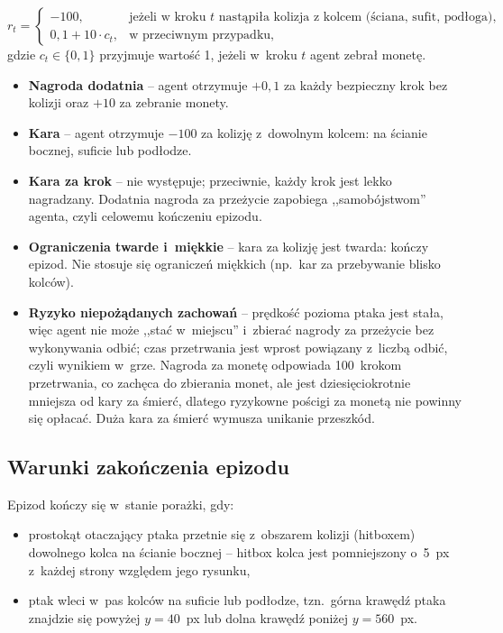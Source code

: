 \documentclass[12pt]{article}
\begin{document}
\begin{equation}
    r_t =
    \begin{cases}
        -100, & \text{jeżeli w kroku } t \text{ nastąpiła kolizja z kolcem
        (ściana, sufit, podłoga)}, \\
        0{,}1 + 10 \cdot c_t, & \text{w przeciwnym przypadku},
    \end{cases}
\end{equation}
gdzie $c_t \in \{0, 1\}$ przyjmuje wartość 1, jeżeli w~kroku $t$ agent
zebrał monetę.
 
\begin{itemize}
    \item \textbf{Nagroda dodatnia} -- agent otrzymuje $+0{,}1$ za każdy
    bezpieczny krok bez kolizji oraz $+10$ za zebranie monety.
    \item \textbf{Kara} -- agent otrzymuje $-100$ za kolizję z~dowolnym
    kolcem: na ścianie bocznej, suficie lub podłodze.
    \item \textbf{Kara za krok} -- nie występuje; przeciwnie, każdy krok jest
    lekko nagradzany. Dodatnia nagroda za przeżycie zapobiega
    ,,samobójstwom'' agenta, czyli celowemu kończeniu epizodu.
    \item \textbf{Ograniczenia twarde i~miękkie} -- kara za kolizję jest
    twarda: kończy epizod. Nie stosuje się ograniczeń miękkich (np.\ kar
    za przebywanie blisko kolców).
    \item \textbf{Ryzyko niepożądanych zachowań} -- prędkość pozioma ptaka
    jest stała, więc agent nie może ,,stać w~miejscu'' i~zbierać nagrody
    za przeżycie bez wykonywania odbić; czas przetrwania jest wprost
    powiązany z~liczbą odbić, czyli wynikiem w~grze. Nagroda za monetę
    odpowiada 100~krokom przetrwania, co zachęca do zbierania monet, ale
    jest dziesięciokrotnie mniejsza od kary za śmierć, dlatego ryzykowne
    pościgi za monetą nie powinny się opłacać. Duża kara za śmierć wymusza
    unikanie przeszkód.
\end{itemize}

\subsection{Warunki zakończenia epizodu}

Epizod kończy się w~stanie porażki, gdy:
\begin{itemize}
    \item prostokąt otaczający ptaka przetnie się z~obszarem kolizji
    (hitboxem) dowolnego kolca na ścianie bocznej -- hitbox kolca jest
    pomniejszony o~5~px z~każdej strony względem jego rysunku,
    \item ptak wleci w~pas kolców na suficie lub podłodze, tzn.\ górna
    krawędź ptaka znajdzie się powyżej $y = 40$~px lub dolna krawędź
    poniżej $y = 560$~px.
\end{itemize}
\end{document}
